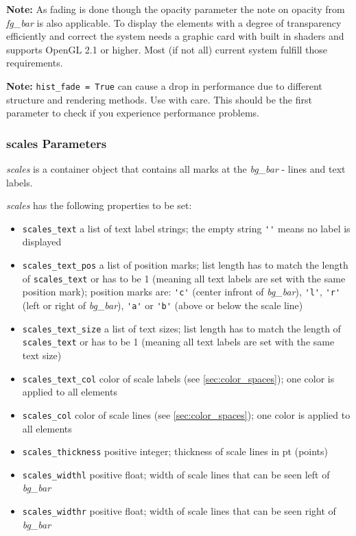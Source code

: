 \documentclass[12pt,a4paper]{book}
\begin{document}
\textbf{Note:} As fading is done though the opacity parameter the note on opacity from \textit{fg\_bar} is also applicable. To display the elements with a degree of transparency efficiently and correct the system needs a graphic card with built in shaders and supports OpenGL 2.1 or higher. Most (if not all) current system fulfill those requirements.

\textbf{Note:} \verb|hist_fade = True| can cause a drop in performance due to different structure and rendering methods. Use with care. This should be the first parameter to check if you experience performance problems.

\subsubsection{scales Parameters}

\textit{scales} is a container object that contains all marks at the \textit{bg\_bar} - lines and text labels.

\textit{scales} has the following properties to be set:
\begin{itemize}
	\item \verb|scales_text| a list of text label strings; the empty string \verb|''| means no label is displayed
	\item \verb|scales_text_pos| a list of position marks; list length has to match the length of \verb|scales_text| or has to be 1 (meaning all text labels are set with the same position mark); position marks are: \verb|'c'| (center infront of \textit{bg\_bar}), \verb|'l'|, \verb|'r'| (left or right of \textit{bg\_bar}), \verb|'a'| or \verb|'b'| (above or below the scale line)
	\item \verb|scales_text_size| a list of text sizes;  list length has to match the length of \verb|scales_text| or has to be 1 (meaning all text labels are set with the same text size)
	\item \verb|scales_text_col| color of scale labels (see \ref{sec:color_spaces}); one color is applied to all elements
	\item \verb|scales_col| color of scale lines (see \ref{sec:color_spaces}); one color is applied to all elements
	\item \verb|scales_thickness| positive integer; thickness of scale lines in pt (points)
	\item \verb|scales_widthl| positive float; width of scale lines that can be seen left of \textit{bg\_bar}
	\item \verb|scales_widthr| positive float; width of scale lines that can be seen right of \textit{bg\_bar}
\end{itemize}
\end{document}
